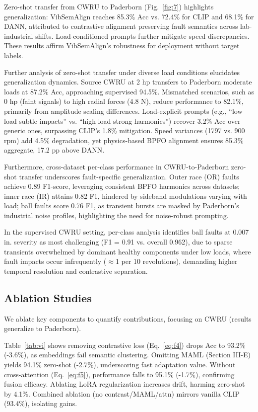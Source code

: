\begin{table}[htbp]
\begin{table}[htbp]
Zero-shot transfer from CWRU to Paderborn (Fig.~\ref{fig:7}) highlights generalization: VibSemAlign reaches 85.3\% Acc vs. 72.4\% for CLIP and 68.1\% for DANN, attributed to contrastive alignment preserving fault semantics across lab-industrial shifts. Load-conditioned prompts further mitigate speed discrepancies. These results affirm VibSemAlign's robustness for deployment without target labels.

\noindent Further analysis of zero-shot transfer under diverse load conditions elucidates generalization dynamics. Source CWRU at 2 hp transfers to Paderborn moderate loads at 87.2\% Acc, approaching supervised 94.5\%. Mismatched scenarios, such as 0 hp (faint signals) to high radial forces (4.8 N), reduce performance to 82.1\%, primarily from amplitude scaling differences. Load-explicit prompts (e.g., ``low load subtle impacts'' vs. ``high load strong harmonics'') recover 3.2\% Acc over generic ones, surpassing CLIP's 1.8\% mitigation. Speed variances (1797 vs. 900 rpm) add 4.5\% degradation, yet physics-based BPFO alignment ensures 85.3\% aggregate, 17.2 pp above DANN.

Furthermore, cross-dataset per-class performance in CWRU-to-Paderborn zero-shot transfer underscores fault-specific generalization. Outer race (OR) faults achieve 0.89 F1-score, leveraging consistent BPFO harmonics across datasets; inner race (IR) attains 0.82 F1, hindered by sideband modulations varying with load; ball faults score 0.76 F1, as transient bursts are masked by Paderborn's industrial noise profiles, highlighting the need for noise-robust prompting.

In the supervised CWRU setting, per-class analysis identifies ball faults at 0.007 in. severity as most challenging (F1 = 0.91 vs. overall 0.962), due to sparse transients overwhelmed by dominant healthy components under low loads, where fault impacts occur infrequently ($\approx$1 per 10 revolutions), demanding higher temporal resolution and contrastive separation.

\subsection{Ablation Studies}

We ablate key components to quantify contributions, focusing on CWRU (results generalize to Paderborn).

Table~\ref{tab:vi} shows removing contrastive loss (Eq.~\ref{eq:f4}) drops Acc to 93.2\% (-3.6\%), as embeddings fail semantic clustering. Omitting MAML (Section III-E) yields 94.1\% zero-shot (-2.7\%), underscoring fast adaptation value. Without cross-attention (Eq.~\ref{eq:f5}), performance falls to 95.1\% (-1.7\%), confirming fusion efficacy. Ablating LoRA regularization increases drift, harming zero-shot by 4.1\%. Combined ablation (no contrast/MAML/attn) mirrors vanilla CLIP (93.4\%), isolating gains.


\end{table}
\end{table}
